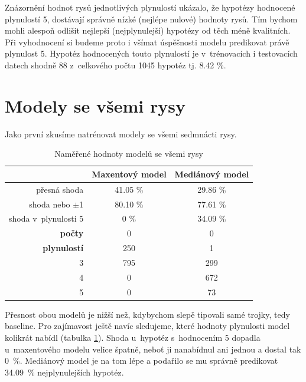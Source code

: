 \documentclass[12pt,a4paper]{report}
\begin{document}
Znázornění hodnot rysů jednotlivých plynulostí ukázalo, že hypotézy hodnocené plynulostí 5, dostávají správně nízké (nejlépe nulové) hodnoty rysů. Tím bychom mohli alespoň odlišit nejlepší (nejplynulejší) hypotézy od těch méně kvalitních. Při vyhodnocení si budeme proto i všímat úspěšnosti modelu predikovat právě plynulost 5. Hypotéz hodnocených touto plynulostí je v~trénovacích i testovacích datech shodně 88 z~celkového počtu 1045 hypotéz tj. 8.42 \%.




\section{Modely se všemi rysy}
Jako první zkusíme natrénovat modely se všemi sedmnácti rysy.

\begin{table}[!htbp]
\begin{center}
\begin{tabular}{|r|c|c|}
\hline
 & \textbf{Maxentový model} & \textbf{Mediánový model} \\
 \hline
přesná shoda & 41.05 \%  & 29.86 \%  \\
\hline
shoda nebo $\pm$1 & 80.10 \% & 77.61 \%  \\
\hline
shoda v~plynulosti 5 &\color{red} 0 \% & 34.09 \%  \\
\hline
\textbf{počty} \quad 1 & \color{red}0 & \color{red}0 \\
\textbf{plynulostí} \quad 2 & 250 & 1 \\
 3 & 795 & 299 \\
 4 & \color{red}0 & 672 \\
 5 & \color{red}0 & 73 \\
\hline
\end{tabular}
\caption{Naměřené hodnoty modelů se všemi rysy}\label{tb:all}
\end{center}
\end{table}

Přesnost obou modelů je nižší než, kdybychom slepě tipovali samé trojky, tedy baseline. Pro zajímavost ještě navíc sledujeme, které hodnoty plynulosti model kolikrát nabídl (tabulka \ref{tb:all}). Shoda u~hypotéz s~hodnocením 5 dopadla u~maxentového modelu velice špatně, neboť ji nanabídnul ani jednou a dostal tak 0~\%. Mediánový model je na tom lépe a podařilo se mu správně predikovat 34.09~\% nejplynulejších hypotéz.
\end{document}
